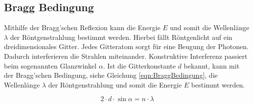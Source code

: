\subsection{Bragg Bedingung}
Mithilfe der Bragg'schen Reflexion kann die Energie $E$ und somit die Wellenlänge $\lambda$ der Röntgenstrahlung bestimmt werden.
Hierbei fällt Röntgenlicht auf ein dreidimensionales Gitter.
Jedes Gitteratom sorgt für eine Beugung der Photonen.
Dadurch interferieren die Strahlen miteinander.
Konstruktive Interferenz passiert beim sogenannten Glanzwinkel $\alpha$.
Ist die Gitterkonstante $d$ bekannt, kann mit der Bragg'schen Bedingung, siehe Gleichung \eqref{eqn:BraggBedingung},
die Wellenlänge $\lambda$ der Röntgenstrahlung und somit die Energie $E$ bestimmt werden.

\begin{equation}
    \label{eqn:BraggBedingung}
    2 \cdot d \cdot \sin\alpha = n \cdot \lambda
\end{equation}